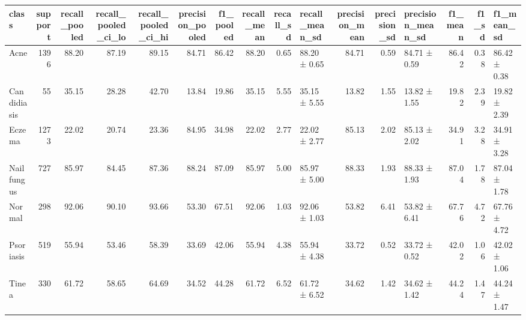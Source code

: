 \begin{tabular}{lrrrrrrrrlrrlrrl}
\toprule
class & support & recall\_pooled & recall\_pooled\_ci\_lo & recall\_pooled\_ci\_hi & precision\_pooled & f1\_pooled & recall\_mean & recall\_sd & recall\_mean\_sd & precision\_mean & precision\_sd & precision\_mean\_sd & f1\_mean & f1\_sd & f1\_mean\_sd \\
\midrule
Acne & 1396 & 88.20 & 87.19 & 89.15 & 84.71 & 86.42 & 88.20 & 0.65 & 88.20 ± 0.65 & 84.71 & 0.59 & 84.71 ± 0.59 & 86.42 & 0.38 & 86.42 ± 0.38 \\
Candidiasis & 55 & 35.15 & 28.28 & 42.70 & 13.84 & 19.86 & 35.15 & 5.55 & 35.15 ± 5.55 & 13.82 & 1.55 & 13.82 ± 1.55 & 19.82 & 2.39 & 19.82 ± 2.39 \\
Eczema & 1273 & 22.02 & 20.74 & 23.36 & 84.95 & 34.98 & 22.02 & 2.77 & 22.02 ± 2.77 & 85.13 & 2.02 & 85.13 ± 2.02 & 34.91 & 3.28 & 34.91 ± 3.28 \\
Nail fungus & 727 & 85.97 & 84.45 & 87.36 & 88.24 & 87.09 & 85.97 & 5.00 & 85.97 ± 5.00 & 88.33 & 1.93 & 88.33 ± 1.93 & 87.04 & 1.78 & 87.04 ± 1.78 \\
Normal & 298 & 92.06 & 90.10 & 93.66 & 53.30 & 67.51 & 92.06 & 1.03 & 92.06 ± 1.03 & 53.82 & 6.41 & 53.82 ± 6.41 & 67.76 & 4.72 & 67.76 ± 4.72 \\
Psoriasis & 519 & 55.94 & 53.46 & 58.39 & 33.69 & 42.06 & 55.94 & 4.38 & 55.94 ± 4.38 & 33.72 & 0.52 & 33.72 ± 0.52 & 42.02 & 1.06 & 42.02 ± 1.06 \\
Tinea & 330 & 61.72 & 58.65 & 64.69 & 34.52 & 44.28 & 61.72 & 6.52 & 61.72 ± 6.52 & 34.62 & 1.42 & 34.62 ± 1.42 & 44.24 & 1.47 & 44.24 ± 1.47 \\
\bottomrule
\end{tabular}
